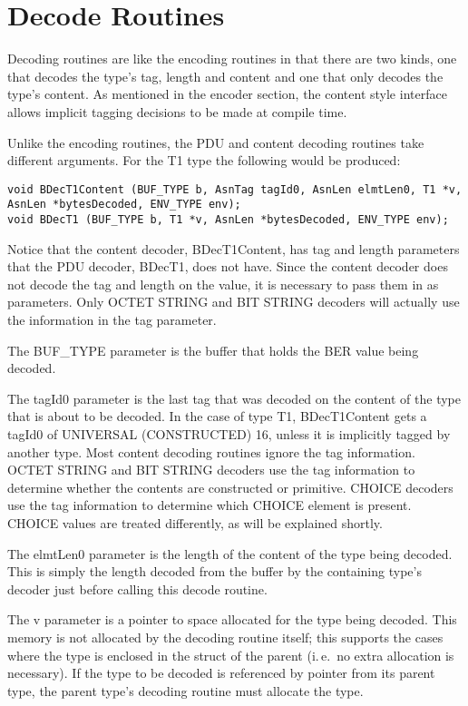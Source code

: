 \section{\label{decode-gen-C-section}Decode Routines}

Decoding routines are like the encoding routines in that there are two
kinds, one that decodes the type's tag, length and content and one
that only decodes the type's content.  As mentioned in the encoder
section, the content style interface allows implicit tagging decisions
to be made at compile time.

Unlike the encoding routines, the PDU and content decoding routines
take different arguments.  For the {\C T1} type the following would be
produced:
\begin{verbatim}
void BDecT1Content (BUF_TYPE b, AsnTag tagId0, AsnLen elmtLen0, T1 *v, AsnLen *bytesDecoded, ENV_TYPE env);
void BDecT1 (BUF_TYPE b, T1 *v, AsnLen *bytesDecoded, ENV_TYPE env);
\end{verbatim}

Notice that the content decoder, {\C BDecT1Content}, has tag and
length parameters that the PDU decoder, {\C BDecT1}, does not have.
Since the content decoder does not decode the tag and length on the
value, it is necessary to pass them in as parameters. Only OCTET
STRING and BIT STRING decoders will actually use the information
in the tag parameter.

The {\C BUF\_TYPE} parameter is the buffer that holds the BER value
being decoded.

The {\C tagId0} parameter is the last tag that was decoded on the
content of the type that is about to be decoded.  In the case of type
{\C T1}, {\C BDecT1Content} gets a tagId0 of UNIVERSAL (CONSTRUCTED) 16,
unless it is implicitly tagged by another type.  Most content decoding
routines ignore the tag information. OCTET STRING and BIT STRING
decoders use the tag information to determine whether the contents are
constructed or primitive.  CHOICE decoders use the tag information to
determine which CHOICE element is present.  CHOICE values are treated
differently, as will be explained shortly.

The {\C elmtLen0} parameter is the length of the content of the type
being decoded.  This is simply the length decoded from the buffer by
the containing type's decoder just before calling this decode routine.

The {\C v} parameter is a pointer to space allocated for the type
being decoded.  This memory is not allocated by the decoding routine
itself; this supports the cases where the type is enclosed in the
struct of the parent (i.\,e.\  no extra allocation is necessary).  If
the type to be decoded is referenced by pointer from its parent type,
the parent type's decoding routine must allocate the type.


